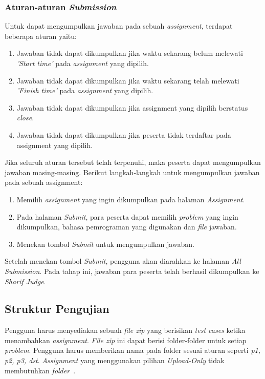 \subsubsection{Aturan-aturan \textit{Submission}}
Untuk dapat mengumpulkan jawaban pada sebuah \textit{assignment}, terdapat beberapa aturan yaitu:
\begin{enumerate}
	\item Jawaban tidak dapat dikumpulkan jika waktu sekarang belum melewati \textit{'Start time'} pada \textit{assignment} yang dipilih.
	\item Jawaban tidak dapat dikumpulkan jika waktu sekarang telah melewati \textit{'Finish time'} pada \textit{assignment} yang dipilih.
	\item Jawaban tidak dapat dikumpulkan jika assignment yang dipilih berstatus \textit{close}.
	\item Jawaban tidak dapat dikumpulkan jika peserta tidak terdaftar pada assignment yang dipilih.
\end{enumerate}

Jika seluruh aturan tersebut telah terpenuhi, maka peserta dapat mengumpulkan jawaban masing-masing. Berikut langkah-langkah untuk mengumpulkan jawaban pada sebuah assignment:
\begin{enumerate}
	\item Memilih \textit{assignment} yang ingin dikumpulkan pada halaman \textit{Assignment}.
	\item Pada halaman \textit{Submit}, para peserta dapat memilih \textit{problem} yang ingin dikumpulkan, bahasa pemrograman yang digunakan dan \textit{file} jawaban.
	\item Menekan tombol \textit{Submit} untuk mengumpulkan jawaban.
\end{enumerate}

Setelah menekan tombol \textit{Submit}, pengguna akan diarahkan ke halaman \textit{All Submission}. Pada tahap ini, jawaban para peserta telah berhasil dikumpulkan ke \textit{Sharif Judge}.

\subsection{Struktur Pengujian}

Pengguna harus menyediakan sebuah \textit{file zip} yang berisikan \textit{test cases} ketika menambahkan \textit{assignment}. \textit{File zip} ini dapat berisi folder-folder untuk setiap \textit{problem}. Pengguna harus memberikan nama pada folder sesuai aturan seperti \textit{p1, p2, p3, dst}. \textit{Assignment} yang menggunakan pilihan \textit{Upload-Only} tidak membutuhkan \textit{folder}~\cite{mjnaderi:14:sharifjudgedoc}.

